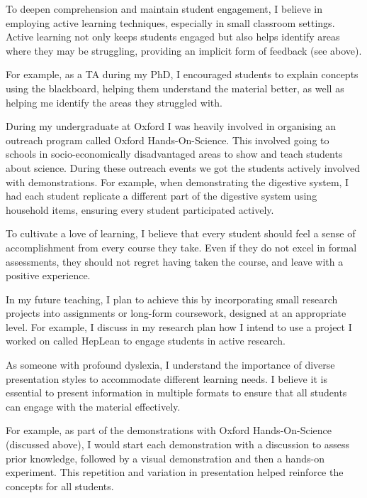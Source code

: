 \documentclass[12pt,letter]{article}
\newcounter{customtitle}
\begin{document}
To deepen comprehension and maintain student engagement, I believe in employing active learning techniques, especially in small classroom settings. Active learning not only keeps students engaged but also helps identify areas where they may be struggling, providing an implicit form of feedback (see above).

For example, as a TA during my PhD, I encouraged students to explain concepts using the blackboard, helping  them understand the material better, as well as helping me identify the areas they struggled with. 

During my undergraduate at Oxford I was heavily involved in organising an outreach program called Oxford Hands-On-Science. This involved going to schools in socio-economically  disadvantaged areas to show and teach students about science. During these outreach events we got the students actively involved with demonstrations. For example, when demonstrating the digestive system,  I had each student replicate a different part of the digestive system using household items, ensuring every student participated actively.

  
To cultivate a love of learning, I believe that every student should feel a sense of accomplishment from every course they take. Even if they do not excel in formal assessments, they should not regret having taken the course, and leave with a positive experience.


In my future teaching, I plan to achieve this by incorporating small research projects into assignments or long-form coursework, designed at an appropriate level. For example, I discuss in my research plan how I intend to use a project I worked on called HepLean to engage students in active research.

 As someone with profound dyslexia, I understand the importance of diverse presentation styles to accommodate different learning needs. I believe it is essential to present information in multiple formats to ensure that all students can engage with the material effectively.
 
 For example, as part of the demonstrations with Oxford Hands-On-Science (discussed above), I would start each demonstration with a discussion to assess prior knowledge, followed by a visual demonstration and then a hands-on experiment. This repetition and variation in presentation helped reinforce the concepts for all students.
   
\end{document}
